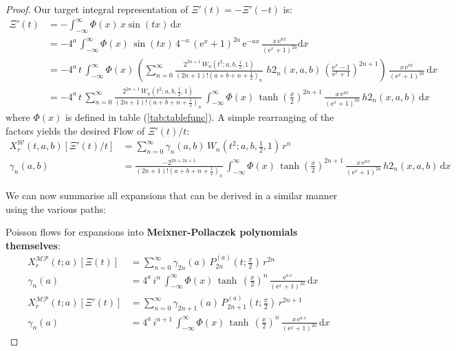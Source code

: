 \documentclass[a4paper,11pt,twoside]{amsart}
\newcommand{\verifiedeq}{=}
\newcommand{\verifiedeq}{\stackrel{\checkmark}{=}}
\begin{document}
\begin{proof}
Our target integral representation of $\Xi'(t) = -\Xi'(-t)$ is:
\begin{align}
 \Xi'(t) &\verifiedeq -\int_{-\infty}^\infty \Phi(x)\,x\sin(tx)\, \mathrm{d}x \\
 &\verifiedeq -4^a\,\int_{-\infty}^\infty \Phi(x)\,\sin(tx)\,4^{-a}\,(\mathrm{e}^x+1)^{2a}\,\mathrm{e}^{-ax} \,\frac{x\,\mathrm{e}^{ax}}{(\mathrm{e}^x+1)^{2a}} \mathrm{d}x \\
 &\verifiedeq -4^a\,t\,\int_{-\infty}^\infty \Phi(x)\,\left(\sum_{n=0}^\infty \frac{2^{2n+1}\,W_n\left(t^2;a,b,\frac12,1\right)}{(2n+1)!\left(a+b+n+\frac12\right)_n}\, \,h2_n(x,a,b)\,\left(\frac{\textrm{e}^{x}-1}{\textrm{e}^{x}+1}\right)^{2n+1}\right)\,\frac{x\,\mathrm{e}^{ax}}{(\mathrm{e}^x+1)^{2a}}\, \mathrm{d}x \\
 &\verifiedeq -4^a\,t\,\sum_{n=0}^\infty \frac{2^{2n+1}\,W_n\left(t^2;a,b,\frac12,1\right)}{(2n+1)!\left(a+b+n+\frac12\right)_n}\,\int_{-\infty}^{\infty} \Phi(x)\,\tanh\left(\frac{x}{2}\right)^{2n+1}\,\frac{x\,\mathrm{e}^{ax}}{(\mathrm{e}^x+1)^{2a}}\,h2_n(x,a,b)\,\mathrm{d}x
\end{align}
where $\Phi(x)$ is defined in table (\ref{tab:tablefunc}). A simple rearranging of the factors yields the desired Flow of $\Xi'(t)/t$:
\begin{align}
X^\mathcal{W}_r(t,a,b)\left[\Xi'(t)/t\right] &\verifiedeq \sum_{n=0}^\infty \gamma_n(a,b)\,W_n\left(t^2;a,b,\frac12,1\right)\,r^n \\
  \gamma_n(a,b) &\verifiedeq \frac{-2^{2n+2a+1}}{(2n+1)!\left(a+b+n+\frac12\right)_n}\,\int_{-\infty}^{\infty} \Phi(x)\,\tanh\left(\frac{x}{2}\right)^{2n+1}\,\frac{x\,\mathrm{e}^{ax}}{(\mathrm{e}^x+1)^{2a}}\,h2_n(x,a,b)\,\mathrm{d}x
\end{align}

We can now summarise all expansions that can be derived in a similar manner using the various paths:

Poisson flows for expansions into \textbf{Meixner-Pollaczek polynomials themselves}:
\begin{align}
X^\mathcal{MP}_r(t;a)\left[\Xi(t)\right] &\verifiedeq \sum_{n=0}^\infty \gamma_{2n}(a)\,P_{2n}^{(a)}\left(t;\frac{\pi}{2}\right)\,r^{2n} \\
\gamma_n(a) &\verifiedeq 4^a\,i^n\,\int_{-\infty}^{\infty} \Phi(x)\,\tanh\,\left(\frac{x}{2}\right)^n\,\frac{\textrm{e}^{a\,x}}{(\textrm{e}^x+1)^{2a}}\,\mathrm{d}x \\
X^\mathcal{MP}_r(t;a)\left[\Xi'(t)\right] &\verifiedeq \sum_{n=0}^\infty \gamma_{2n+1}(a)\,P_{2n+1}^{(a)}\left(t;\frac{\pi}{2}\right)\,r^{2n+1} \\
\gamma_n(a) &\verifiedeq 4^a\,i^{n+1}\,\int_{-\infty}^{\infty} \Phi(x)\,\tanh\,\left(\frac{x}{2}\right)^n\,\frac{x\,\textrm{e}^{a\,x}}{(\textrm{e}^x+1)^{2a}}\,\mathrm{d}x
\end{align}


\end{proof}
\end{document}
